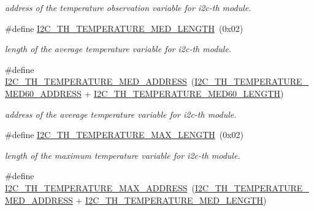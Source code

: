 \begin{DoxyCompactItemize}
\begin{DoxyCompactList}\small\item\em address of the temperature observation variable for i2c-\/th module. \end{DoxyCompactList}\item 
\mbox{\label{registers-th_8h_ae58cfee6bace2cb489b10eb56a4ce7e4}} 
\#define \hyperlink{registers-th_8h_ae58cfee6bace2cb489b10eb56a4ce7e4}{I2\+C\+\_\+\+T\+H\+\_\+\+T\+E\+M\+P\+E\+R\+A\+T\+U\+R\+E\+\_\+\+M\+E\+D\+\_\+\+L\+E\+N\+G\+TH}~(0x02)
\begin{DoxyCompactList}\small\item\em length of the average temperature variable for i2c-\/th module. \end{DoxyCompactList}\item 
\mbox{\label{registers-th_8h_a805a88b64e74c7a02286550560457b1d}} 
\#define \hyperlink{registers-th_8h_a805a88b64e74c7a02286550560457b1d}{I2\+C\+\_\+\+T\+H\+\_\+\+T\+E\+M\+P\+E\+R\+A\+T\+U\+R\+E\+\_\+\+M\+E\+D\+\_\+\+A\+D\+D\+R\+E\+SS}~(\hyperlink{registers-th_8h_a0defa72b89f6bbfe41feb464a1eb6c81}{I2\+C\+\_\+\+T\+H\+\_\+\+T\+E\+M\+P\+E\+R\+A\+T\+U\+R\+E\+\_\+\+M\+E\+D60\+\_\+\+A\+D\+D\+R\+E\+SS} + \hyperlink{registers-th_8h_ac6f3b8ab3eade373310b50c2248bac95}{I2\+C\+\_\+\+T\+H\+\_\+\+T\+E\+M\+P\+E\+R\+A\+T\+U\+R\+E\+\_\+\+M\+E\+D60\+\_\+\+L\+E\+N\+G\+TH})
\begin{DoxyCompactList}\small\item\em address of the average temperature variable for i2c-\/th module. \end{DoxyCompactList}\item 
\mbox{\label{registers-th_8h_a919ba5b2f1aea01d8b48ac119d705552}} 
\#define \hyperlink{registers-th_8h_a919ba5b2f1aea01d8b48ac119d705552}{I2\+C\+\_\+\+T\+H\+\_\+\+T\+E\+M\+P\+E\+R\+A\+T\+U\+R\+E\+\_\+\+M\+A\+X\+\_\+\+L\+E\+N\+G\+TH}~(0x02)
\begin{DoxyCompactList}\small\item\em length of the maximum temperature variable for i2c-\/th module. \end{DoxyCompactList}\item 
\mbox{\label{registers-th_8h_a6d5b14a0e8a228589bdb9ece79d757fd}} 
\#define \hyperlink{registers-th_8h_a6d5b14a0e8a228589bdb9ece79d757fd}{I2\+C\+\_\+\+T\+H\+\_\+\+T\+E\+M\+P\+E\+R\+A\+T\+U\+R\+E\+\_\+\+M\+A\+X\+\_\+\+A\+D\+D\+R\+E\+SS}~(\hyperlink{registers-th_8h_a805a88b64e74c7a02286550560457b1d}{I2\+C\+\_\+\+T\+H\+\_\+\+T\+E\+M\+P\+E\+R\+A\+T\+U\+R\+E\+\_\+\+M\+E\+D\+\_\+\+A\+D\+D\+R\+E\+SS} + \hyperlink{registers-th_8h_ae58cfee6bace2cb489b10eb56a4ce7e4}{I2\+C\+\_\+\+T\+H\+\_\+\+T\+E\+M\+P\+E\+R\+A\+T\+U\+R\+E\+\_\+\+M\+E\+D\+\_\+\+L\+E\+N\+G\+TH})

\end{DoxyCompactItemize}
